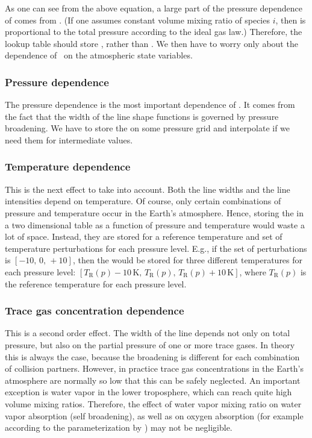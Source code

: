 As one can see from the above equation, a large part of the pressure
dependence of  comes from . (If one assumes
constant volume mixing ratio of species $i$, then  is
proportional to the total pressure according to the ideal gas law.) 
Therefore, the lookup table should store \AbsXsec, rather than
\AbsCoef. We then have to worry only about the dependence of \AbsXsec\
on the atmospheric state variables.

\subsubsection{Pressure dependence}

The pressure dependence is the most important dependence of
\AbsXsec. It comes from the fact that the width of the line shape
functions is governed by pressure broadening. We have to store the
\aAbsXsec{i} on some pressure grid and interpolate if we need them for
intermediate values.

\subsubsection{Temperature dependence}

This is the next effect to take into account. Both the line widths and
the line intensities depend on temperature. Of course, only certain
combinations of pressure and temperature occur in the Earth's
atmosphere. Hence, storing the  in a two dimensional table
as a function of pressure and temperature would waste a lot of space.
Instead, they are stored for a reference temperature and set of
temperature perturbations for each pressure level. E.g., if the set of
perturbations is $[-10,\, 0,\, +10]$, then the \aAbsXsec{i} would be stored
for three different temperatures for each pressure level:
$[T_\mathrm{R}(p)-10\,\mbox{K},\, T_\mathrm{R}(p),\, T_\mathrm{R}(p)+10\,\mbox{K}]$, where
$T_\mathrm{R}(p)$ is the reference temperature for each pressure level.

\subsubsection{Trace gas concentration dependence}

This is a second order effect. The width of the line depends not only
on total pressure, but also on the partial pressure of one or more
trace gases. In theory this is always the case, because the broadening
is different for each combination of collision partners. However, in
practice trace gas concentrations in the Earth's atmosphere are
normally so low that this can be safely neglected. An important
exception is water vapor in the lower troposphere, which can reach
quite high volume mixing ratios. Therefore, the effect of water vapor
mixing ratio on water vapor absorption (self broadening), as well as
on oxygen absorption (for example according to the parameterization by
\citet{pwr:93}) may not be negligible.

